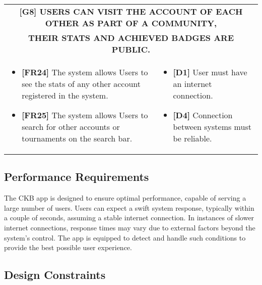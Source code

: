 \documentclass{article}
\begin{document}
\begin{table}[H]
\begin{adjustwidth}{-1in}{-1in}
 \renewcommand{\arraystretch}{1.5}
    \begin{tabular}{|p{9.5cm}|p{9.5cm}|}
        \hline
        \multicolumn{2}{|c|}{\textbf{[G8] USERS CAN VISIT THE ACCOUNT OF EACH OTHER AS PART OF A COMMUNITY,}} \\
        \multicolumn{2}{|c|}{\textbf{THEIR STATS AND ACHIEVED BADGES ARE PUBLIC.}} \\
        \hline
        \begin{itemize}[label={}, left=0pt, align=left, itemsep=5pt]
            \item \textbf{[FR24]} The system allows Users to see the stats of any other account registered in the system.
            \item \textbf{[FR25]} The system allows Users to search for other accounts or tournaments on the search bar.
        \end{itemize} &
        \begin{itemize}[label={}, left=0pt, align=left, itemsep=5pt]
            \item \textbf{[D1]} User must have an internet connection.
            \item \textbf{[D4]} Connection between systems must be reliable.
        \end{itemize} \\
        \hline
    \end{tabular}
\end{adjustwidth}
\end{table}

\newpage

\subsection{Performance Requirements}
The CKB app is designed to ensure optimal performance, capable of serving a large number of users. Users can expect a swift system response, typically within a couple of seconds, assuming a stable internet connection. In instances of slower internet connections, response times may vary due to external factors beyond the system's control. The app is equipped to detect and handle such conditions to provide the best possible user experience.

\subsection{Design Constraints}
\end{document}
